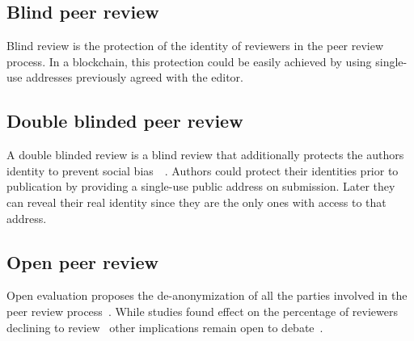 \subsection*{Blind peer review}
Blind review is the protection of the identity of reviewers in the peer review
process. In a blockchain, this protection could be easily achieved by using
single-use addresses previously agreed with the editor.

\subsection*{Double blinded peer review}
A double blinded review is a blind review that additionally protects the authors
identity to prevent social bias~\cite{lee2013bias}~\cite{budden2008double}.
Authors could protect their identities prior to publication by providing a
single-use public address on submission. Later they can reveal their real
identity since they are the only ones with access to that address.

\subsection*{Open peer review}
Open evaluation proposes the de-anonymization of all the parties involved in the
peer review process~\cite{ford2013defining}. While studies found effect on the
percentage of reviewers declining to review~\cite{van1999effect} other
implications remain open to debate~\cite{groves2010open}.



